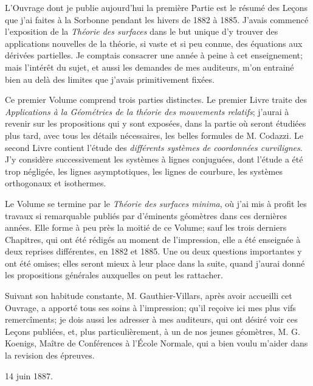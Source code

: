 
L'Ouvrage dont je publie aujourd'hui la première Partie est le résumé des Leçons que j'ai faites à la Sorbonne pendant 
les hivers de 1882 à 1885. J'avais commencé l'exposition de la \textit{Théorie des surfaces} dans le but unique d'y 
trouver des applications nouvelles de la théorie, si vaste et si peu connue, des équations aux dérivées partielles. Je 
comptais consacrer une année à peine à cet enseignement; mais l'intérêt du sujet, et aussi les demandes de mes 
auditeurs, m'on entrainé bien au delà des limites que j'avais primitivement fixées.

Ce premier Volume comprend trois parties distinctes. Le premier Livre traite des \textit{Applications à la Géométries 
de la théorie des mouvements relatifs}; j'aurai à revenir sur les propositions qui y sont exposées, dans la partie où 
seront étudiées plus tard, avec tous les détails nécessaires, les belles formules de M. Codazzi. Le second Livre 
contient l'étude des \textit{différents systèmes de coordonnées curvilignes}. J'y considère successivement les systèmes 
à lignes conjuguées, dont l'étude a été trop négligée, les lignes asymptotiques, les lignes de courbure, les systèmes 
orthogonaux et isothermes.

Le Volume se termine par le \textit{Théorie des surfaces minima}, où j'ai mis à profit les travaux si remarquable 
publiés par d'éminents géomètres dans ces dernières années. Elle forme à peu près la moitié de ce Volume; sauf les 
trois 
derniers Chapitres, qui ont été rédigés au moment de l'impression, elle a été enseignée à deux reprises différentes, en 
1882 et 1885. Une ou deux questions importantes y ont été omises; elles seront mieux à leur place dans la suite, quand 
j'aurai donné les propositions générales auxquelles on peut les rattacher.

Suivant son habitude constante, M. Gauthier-Villars, après avoir accueilli cet Ouvrage, a apporté tous ses soins à 
l'impression; qu'il reçoive ici mes plus vifs remercîments; je dois aussi les adresser à mes auditeurs, qui ont désiré 
voir ces Leçons publiées, et, plus particulièrement, à un de nos jeunes géomètres, M. G. Koenigs, Maître de Conférences 
à l'École Normale, qui a bien voulu m'aider dans la revision des épreuves.

\begin{flushright}
  {\small{14 juin 1887.}}
\end{flushright}
